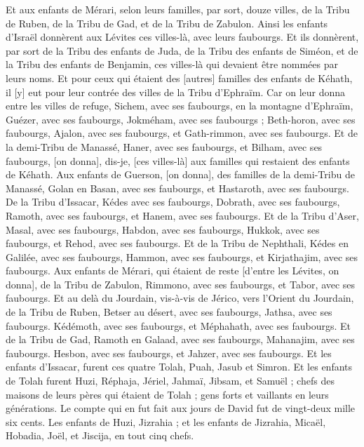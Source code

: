 \begin{multicols}{2}
Et aux enfants de Mérari, selon leurs familles, par sort, douze villes, de la Tribu de Ruben, de la Tribu de Gad, et de la Tribu de Zabulon.
Ainsi les enfants d'Israël donnèrent aux Lévites ces villes-là, avec leurs faubourgs.
Et ils donnèrent, par sort de la Tribu des enfants de Juda, de la Tribu des enfants de Siméon, et de la Tribu des enfants de Benjamin, ces villes-là qui devaient être nommées par leurs noms.
Et pour ceux qui étaient des [autres] familles des enfants de Kéhath, il [y] eut pour leur contrée des villes de la Tribu d'Ephraïm.
Car on leur donna entre les villes de refuge, Sichem, avec ses faubourgs, en la montagne d'Ephraïm, Guézer, avec ses faubourgs,
Jokméham, avec ses faubourgs ; Beth-horon, avec ses faubourgs,
Ajalon, avec ses faubourgs, et Gath-rimmon, avec ses faubourgs.
Et de la demi-Tribu de Manassé, Haner, avec ses faubourgs, et Bilham, avec ses faubourgs, [on donna], dis-je, [ces villes-là] aux familles qui restaient des enfants de Kéhath.
Aux enfants de Guerson, [on donna], des familles de la demi-Tribu de Manassé, Golan en Basan, avec ses faubourgs, et Hastaroth, avec ses faubourgs.
De la Tribu d'Issacar, Kédes avec ses faubourgs, Dobrath, avec ses faubourgs,
Ramoth, avec ses faubourgs, et Hanem, avec ses faubourgs.
Et de la Tribu d'Aser, Masal, avec ses faubourgs, Habdon, avec ses faubourgs,
Hukkok, avec ses faubourgs, et Rehod, avec ses faubourgs.
Et de la Tribu de Nephthali, Kédes en Galilée, avec ses faubourgs, Hammon, avec ses faubourgs, et Kirjathajim, avec ses faubourgs.
Aux enfants de Mérari, qui étaient de reste [d'entre les Lévites, on donna], de la Tribu de Zabulon, Rimmono, avec ses faubourgs, et Tabor, avec ses faubourgs.
Et au delà du Jourdain, vis-à-vis de Jérico, vers l'Orient du Jourdain, de la Tribu de Ruben, Betser au désert, avec ses faubourgs, Jathsa, avec ses faubourgs.
Kédémoth, avec ses faubourgs, et Méphahath, avec ses faubourgs.
Et de la Tribu de Gad, Ramoth en Galaad, avec ses faubourgs, Mahanajim, avec ses faubourgs.
Hesbon, avec ses faubourgs, et Jahzer, avec ses faubourgs.
\VerseOne{}Et les enfants d'Issacar, furent ces quatre Tolah, Puah, Jasub et Simron.
Et les enfants de Tolah furent Huzi, Réphaja, Jériel, Jahmaï, Jibsam, et Samuël ; chefs des maisons de leurs pères qui étaient de Tolah ; gens forts et vaillants en leurs générations. Le compte qui en fut fait aux jours de David fut de vingt-deux mille six cents.
Les enfants de Huzi, Jizrahia ; et les enfants de Jizrahia, Micaël, Hobadia, Joël, et Jiscija, en tout cinq chefs.

\end{multicols}
